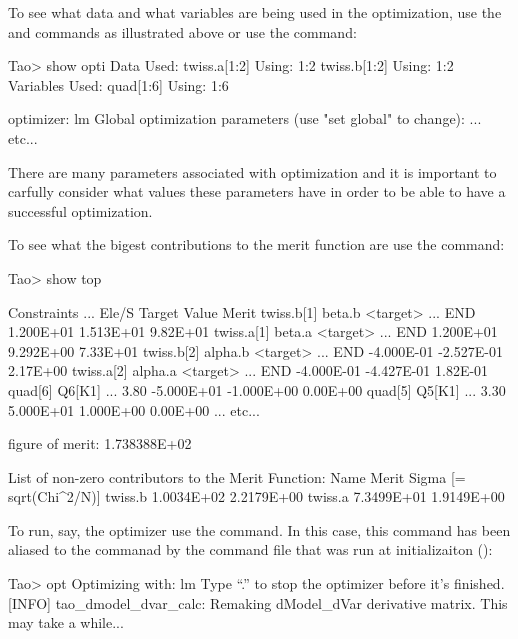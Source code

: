 \documentclass{hitec}
\begin{document}
{\begin{code}
\begin{code}
To see what data and what variables are being used in the optimization, use the  and
 commands as illustrated above or use the  command:
\begin{code}
Tao> show opti
Data Used:
  twiss.a[1:2]                                   Using: 1:2
  twiss.b[1:2]                                   Using: 1:2
Variables Used:
  quad[1:6]                                      Using: 1:6

optimizer:        lm
Global optimization parameters (use "set global" to change):
... etc...
\end{code}
There are many parameters associated with optimization and it is important to carfully consider
what values these parameters have in order to be able to have a successful optimization.

To see what the bigest contributions to the merit function
are use the  command:
\begin{code}
Tao> show top

Constraints                   ...   Ele/S     Target      Value      Merit  
twiss.b[1]  beta.b <target>   ...   END       1.200E+01   1.513E+01  9.82E+01
twiss.a[1]  beta.a <target>   ...   END       1.200E+01   9.292E+00  7.33E+01
twiss.b[2]  alpha.b <target>  ...   END      -4.000E-01  -2.527E-01  2.17E+00
twiss.a[2]  alpha.a <target>  ...   END      -4.000E-01  -4.427E-01  1.82E-01
quad[6]     Q6[K1]            ...   3.80     -5.000E+01  -1.000E+00  0.00E+00
quad[5]     Q5[K1]            ...   3.30      5.000E+01   1.000E+00  0.00E+00
... etc...

 figure of merit: 1.738388E+02

List of non-zero contributors to the Merit Function:
Name                                          Merit           Sigma [= sqrt(Chi^2/N)]
twiss.b                                       1.0034E+02      2.2179E+00
twiss.a                                       7.3499E+01      1.9149E+00
\end{code}

To run, say, the  optimizer use the  command. In this case, this command
has been aliased to the  commanad by the  command file that was run
at initializaiton ():
\begin{code}
Tao> opt
Optimizing with: lm
Type ``.'' to stop the optimizer before it's finished.
[INFO] tao_dmodel_dvar_calc:
    Remaking dModel_dVar derivative matrix.
    This may take a while...


\end{code}
\end{code}
\end{code}}
\end{document}
